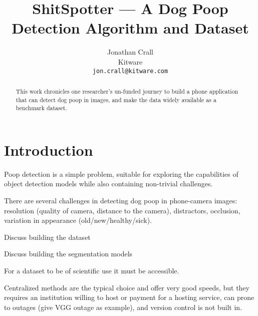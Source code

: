 \documentclass[10pt,twocolumn,letterpaper]{article}
\begin{document}
\title{ShitSpotter --- A Dog Poop Detection Algorithm and Dataset}

\author{Jonathan Crall\\
Kitware\\
{\tt\small jon.crall@kitware.com}
}
\maketitle

\begin{abstract}

    This work chronicles one researcher's un-funded journey to build a phone
    application that can detect dog poop in images, and make the data widely
    available as a benchmark dataset.


\end{abstract}

\section{Introduction}
\label{sec:intro}


Poop detection is a simple problem, suitable for exploring the capabilities of
object detection models while also containing non-trivial challenges.

There are several challenges in detecting dog poop in phone-camera images:
resolution (quality of camera, distance to the camera),
distractors,
occlusion,
variation in appearance (old/new/healthy/sick).

Discuss building the dataset

Discuss building the segmentation models

For a dataset to be of scientific use it must be accessible. 

Centralized methods are the typical choice and offer very good speeds, 
but they requires an institution willing to host or payment for a hosting service,
can prone to outages (give VGG outage as example),
and version control is not built in.
\end{document}
